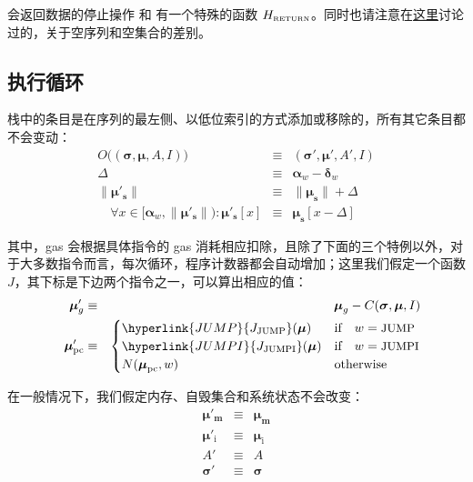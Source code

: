 \documentclass[9pt,oneside]{amsart}
\begin{document}
\begin{multicols}{2}
会返回数据的停止操作 \hyperlink{RETURN}{} 和  有一个特殊的函数 $H_{\text{\tiny RETURN}}$。同时也请注意在\hyperlink{empty_sequence_vs_empty_set}{这里}讨论过的，关于空序列和空集合的差别。

\subsection{执行循环}

栈中的条目是在序列的最左侧、以低位索引的方式添加或移除的，所有其它条目都不会变动：
\begin{eqnarray}
O\big((\boldsymbol{\sigma}, \boldsymbol{\mu}, A, I)\big) & \equiv & (\boldsymbol{\sigma}', \boldsymbol{\mu}', A', I) \\
\Delta & \equiv & \mathbf{\alpha}_{w} - \mathbf{\delta}_{w} \\
\lVert\boldsymbol{\mu}'_{\mathbf{s}}\rVert & \equiv & \lVert\boldsymbol{\mu}_{\mathbf{s}}\rVert + \Delta \\
\quad \forall x \in [\mathbf{\alpha}_{w}, \lVert\boldsymbol{\mu}'_{\mathbf{s}}\rVert): \boldsymbol{\mu}'_{\mathbf{s}}[x] & \equiv & \boldsymbol{\mu}_{\mathbf{s}}[x-\Delta]
\end{eqnarray}

其中，gas 会根据具体指令的 gas 消耗相应扣除，且除了下面的三个特例以外，对于大多数指令而言，每次循环，程序计数器都会自动增加；这里我们假定一个函数 $J$，其下标是下边两个指令之一，可以算出相应的值：
\begin{eqnarray}
\quad \boldsymbol{\mu}'_{g} & \equiv & \boldsymbol{\mu}_{g} - C(\boldsymbol{\sigma}, \boldsymbol{\mu}, I) \label{eq:mu_pc}\\
\quad \boldsymbol{\mu}'_{\mathrm{pc}} & \equiv & \begin{cases}
\hyperlink{JUMP}{J_{\text{JUMP}}}(\boldsymbol{\mu}) & \text{if} \quad w = \text{\small JUMP} \\
\hyperlink{JUMPI}{J_{\text{JUMPI}}}(\boldsymbol{\mu}) & \text{if} \quad w = \text{\small JUMPI} \\
N(\boldsymbol{\mu}_{\mathrm{pc}}, w) & \text{otherwise}
\end{cases}
\end{eqnarray}

在一般情况下，我们假定内存、自毁集合和系统状态不会改变：
\begin{eqnarray}
\boldsymbol{\mu}'_{\mathbf{m}} & \equiv & \boldsymbol{\mu}_{\mathbf{m}} \\
\boldsymbol{\mu}'_{\mathrm{i}} & \equiv & \boldsymbol{\mu}_{\mathrm{i}} \\
A' & \equiv & A \\
\boldsymbol{\sigma}' & \equiv & \boldsymbol{\sigma}
\end{eqnarray}


\end{multicols}
\end{document}

